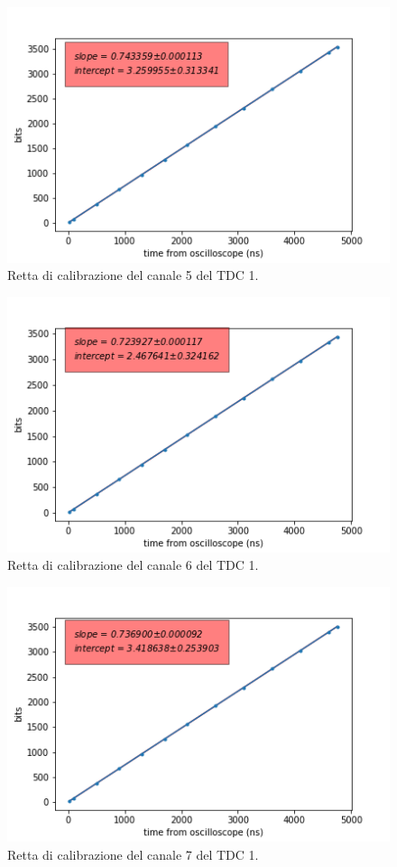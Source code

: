 \begin{figure}[H]
  \centering
  \includegraphics[width=.8\textwidth]{plots/tdc15.png}
  \caption{Retta di calibrazione del canale 5 del TDC 1.}
  \label{fig:tdc15}
\end{figure}

\begin{figure}[H]
  \centering
  \includegraphics[width=.8\textwidth]{plots/tdc16.png}
  \caption{Retta di calibrazione del canale 6 del TDC 1.}
  \label{fig:tdc16}
\end{figure}

\begin{figure}[H]
  \centering
  \includegraphics[width=.8\textwidth]{plots/tdc17.png}
  \caption{Retta di calibrazione del canale 7 del TDC 1.}
  \label{fig:tdc17}
\end{figure}

